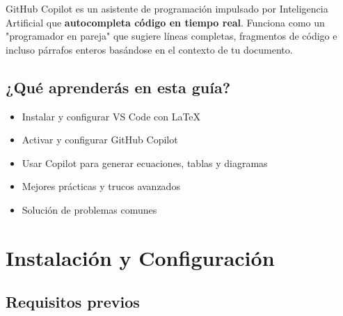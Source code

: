 \documentclass[11pt,a4paper]{article}
\begin{document}
	GitHub Copilot es un asistente de programación impulsado por Inteligencia Artificial que \textbf{autocompleta código en tiempo real}. Funciona como un "programador en pareja" que sugiere líneas completas, fragmentos de código e incluso párrafos enteros basándose en el contexto de tu documento.
	
	\subsection*{¿Qué aprenderás en esta guía?}
	\begin{itemize}
		\item Instalar y configurar VS Code con LaTeX
		\item Activar y configurar GitHub Copilot
		\item Usar Copilot para generar ecuaciones, tablas y diagramas
		\item Mejores prácticas y trucos avanzados
		\item Solución de problemas comunes
	\end{itemize}
	
	\begin{center}
	\end{center}
	
	\newpage
	
	
	\section{Instalación y Configuración}
	
	\subsection{Requisitos previos}
	
\end{document}
